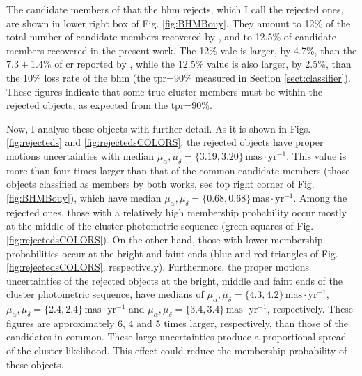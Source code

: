 The candidate members of \citet{Bouy2015} that the \gls{bhm} rejects, which I call the rejected ones, are shown in lower right box of Fig. \ref{fig:BHMBouy}. They amount to 12\% of the total number of candidate members recovered by \citet{Bouy2015}, and to 12.5\% of  candidate members recovered in the present work. The 12\% vale is larger, by 4.7\%, than the $7.3\pm1.4$\% of \gls{cr} reported by \citet{Sarro2014}, while the 12.5\% value is also larger, by 2.5\%, than the 10\% loss rate of the \gls{bhm} (the \gls{tpr}=90\% measured in Section \ref{sect:classifier}). These figures indicate that some true cluster members must be within the rejected objects, as expected from the \gls{tpr}=90\%.

Now, I analyse these objects with further detail. As it is shown in Figs. \ref{fig:rejecteds} and \ref{fig:rejectedsCOLORS}, the rejected objects have proper motions uncertainties with median $\tilde{\mu}_{\alpha},\tilde{\mu}_{\delta}=\{3.19,3.20\} \,\mathrm{mas\cdot yr^{-1}}$. This value is more than four times larger than that of the common candidate members (those objects classified as members by both works, see top right corner of Fig. \ref{fig:BHMBouy}), which have median $\tilde{\mu}_{\alpha},\tilde{\mu}_{\delta}=\{0.68,0.68\} \,\mathrm{mas\cdot yr^{-1}}$. Among the rejected ones, those with a relatively high membership probability occur mostly at the middle of the cluster photometric sequence (green squares of Fig. \ref{fig:rejectedsCOLORS}). On the other hand, those with lower membership probabilities occur at the bright and faint ends (blue and red triangles of Fig. \ref{fig:rejectedsCOLORS}, respectively). Furthermore, the proper motions uncertainties of the rejected objects at the bright, middle and faint ends of the cluster photometric sequence, have medians of $\tilde{\mu}_{\alpha},\tilde{\mu}_{\delta}=\{4.3,4.2\}  \,\mathrm{mas\cdot yr^{-1}}$, $\tilde{\mu}_{\alpha},\tilde{\mu}_{\delta}=\{2.4,2.4\}\,\mathrm{mas\cdot yr^{-1}}$ and $\tilde{\mu}_{\alpha},\tilde{\mu}_{\delta}=\{3.4,3.4\}\,\mathrm{mas\cdot yr^{-1}}$, respectively. These figures are approximately 6, 4 and 5 times larger, respectively, than those of the candidates in common. These large uncertainties produce a proportional spread of the cluster likelihood. This effect could reduce the membership probability of these objects.

